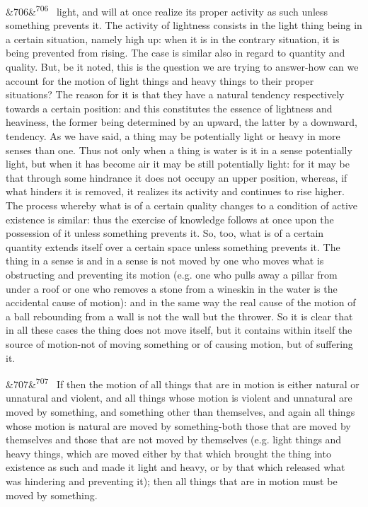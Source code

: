 \documentclass[12pt]{article}
\newcommand{\para}[1][]{\par\noindent\ifx&#1&\else\textsuperscript{\footnotesize #1}~\fi}
\begin{document}
\para[706] light, and will at once realize its proper activity as such unless something prevents it. The activity of lightness consists in the light thing being in a certain situation, namely high up: when it is in the contrary situation, it is being prevented from rising. The case is similar also in regard to quantity and quality. But, be it noted, this is the question we are trying to answer-how can we account for the motion of light things and heavy things to their proper situations? The reason for it is that they have a natural tendency respectively towards a certain position: and this constitutes the essence of lightness and heaviness, the former being determined by an upward, the latter by a downward, tendency. As we have said, a thing may be potentially light or heavy in more senses than one. Thus not only when a thing is water is it in a sense potentially light, but when it has become air it may be still potentially light: for it may be that through some hindrance it does not occupy an upper position, whereas, if what hinders it is removed, it realizes its activity and continues to rise higher. The process whereby what is of a certain quality changes to a condition of active existence is similar: thus the exercise of knowledge follows at once upon the possession of it unless something prevents it. So, too, what is of a certain quantity extends itself over a certain space unless something prevents it. The thing in a sense is and in a sense is not moved by one who moves what is obstructing and preventing its motion (e.g. one who pulls away a pillar from under a roof or one who removes a stone from a wineskin in the water is the accidental cause of motion): and in the same way the real cause of the motion of a ball rebounding from a wall is not the wall but the thrower. So it is clear that in all these cases the thing does not move itself, but it contains within itself the source of motion-not of moving something or of causing motion, but of suffering it.

\para[707] If then the motion of all things that are in motion is either natural or unnatural and violent, and all things whose motion is violent and unnatural are moved by something, and something other than themselves, and again all things whose motion is natural are moved by something-both those that are moved by themselves and those that are not moved by themselves (e.g. light things and heavy things, which are moved either by that which brought the thing into existence as such and made it light and heavy, or by that which released what was hindering and preventing it); then all things that are in motion must be moved by something.
\end{document}
